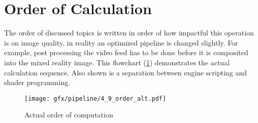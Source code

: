 %
\newpage
\section{Order of Calculation}

The order of discussed topics is written in order of how impactful this 
operation is on image quality, in reality an optimized pipeline is changed 
slightly. For example, post processing the video feed has to be done before it 
is composited into the mixed reality image. This flowchart 
(\ref{fig:steps:order:alt}) demonstrates the actual calculation sequence. Also 
shown is a separation between engine scripting and shader programming.

\begin{figure}[htb]
	\centering
	\texttt{[image: gfx/pipeline/4\_9\_order\_alt.pdf]}
	\caption{Actual order of computation}
	\label{fig:steps:order:alt}
\end{figure}